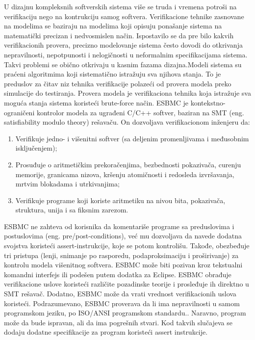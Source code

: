 \documentclass[a4paper]{article}
\begin{document}
	U dizajnu kompleksnih softverskih sistema više se truda i vremena potroši na
	verifikaciju nego na kontrukciju samog softvera. Verifikacione tehnike  zasnovane na modelima se baziraju na modelima koji opisuju ponašanje sistema na matematički precizan i nedvosmislen način. Ispostavilo se da pre bilo kakvih verifikacionih provera, precizno modelovanje sistema često dovodi do otkrivanja nepravilnosti, nepotpunosti i nelogičnosti u neformalnim specifikacijama sistema. Takvi problemi se obično otkrivaju u kasnim fazama dizajna.Modeli sistema su praćeni algoritmima koji sistematično istražuju sva njihova stanja. To je preduslov za čitav niz tehnika verifikacije polazeći od provera modela preko simulacije do testiranja.
	Provera modela je verifikaciona tehnika koja istražuje sva moguća stanja sistema koristeći brute-force način.
	\newline
	ESBMC je kontekstno-ograničeni kontrolor modela za ugrađeni C/C++ softver, baziran na SMT (eng. satisﬁability modulo theory) rešavaču.  On dozvoljava verifikacionom inženjeru da: 
	\newline
	\begin{enumerate}
	\item Verifikuje jedno- i višenitni softver (sa deljenim promenljivama i                       međusobnim isključenjem);
	\item Prosuđuje o aritmetičkim prekoračenjima, bezbednosti pokazivača, curenju               memorije, granicama nizova, kršenju atomičnosti i redosleda izvršavanja,             mrtvim blokadama i utrkivanjima; 
	\item Verifikuje programe koji koriste aritmetiku na nivou bita, pokazivača,                  struktura, unija i sa fiksnim zarezom.
	\end{enumerate}
	ESBMC ne zahteva od korisnika da komentariše programe sa preduslovima i postuslovima (eng. pre/post-conditions), već mu dozvoljava da navede dodatna svojstva koristeći assert-instrukcije, koje se potom kontrolišu. Takođe, obezbeđuje tri pristupa (lenji, snimanje po rasporedu, podaproksimaciju i proširivanje) za kontrolu modela višenitnog softvera. ESBMC može biti pozivan kroz tekstualni komandni interfejs ili podešen putem dodatka za Eclipse. ESBMC obrađuje verifikacione uslove koristeći različite pozadinske teorije i prosleđuje ih direktno u SMT rešavač. Dodatno, ESBMC može da vrati vrednost verifikacionih uslova koristeći.
	\newline
	Podrazumevano, ESBMC proverava da li ima nepravilnosti u samom programskom jeziku, po ISO/ANSI programskom standardu.. Naravno, program može da bude ispravan, ali da ima pogrešnih stvari. Kod takvih slučajeva se dodaju dodatne specifikacije za program koristeći assert instrukcije. 
\end{document}
